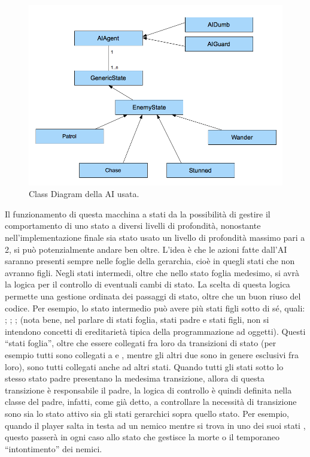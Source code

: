 \begin{figure}[h]
\centerline{\includegraphics[scale=0.45]{images/development/classdiagramAI.png}}
\caption{Class Diagram della AI usata.}
\label{fig:classdiagramAI}
\end{figure}

Il funzionamento di questa macchina a stati da la possibilità di gestire il comportamento di uno stato a diversi livelli di profondità, nonostante nell'implementazione finale sia stato usato un livello di profondità massimo pari a 2, si può potenzialmente andare ben oltre.
L'idea è che le azioni fatte dall'AI saranno presenti sempre nelle foglie della gerarchia, cioè in quegli stati che non avranno figli. Negli stati intermedi, oltre che nello stato foglia medesimo, si avrà la logica per il controllo di eventuali cambi di stato.
La scelta di questa logica permette una gestione ordinata dei passaggi di stato, oltre che un buon riuso del codice. Per esempio, lo stato intermedio  può avere più stati figli sotto di sé, quali: ; ; ;  (nota bene, nel parlare di stati foglia, stati padre e stati figli, non si intendono concetti di ereditarietà tipica della programmazione ad oggetti). Questi ``stati foglia'', oltre che essere collegati fra loro da transizioni di stato (per esempio tutti sono collegati a  e , mentre gli altri due sono in genere esclusivi fra loro), sono tutti collegati anche ad altri stati. Quando tutti gli stati sotto lo stesso stato padre presentano la medesima transizione, allora di questa transizione è responsabile il padre, la logica di controllo è quindi definita nella classe del padre, infatti, come già detto, a controllare la necessità di transizione sono sia lo stato attivo sia gli stati gerarchici sopra quello stato. Per esempio, quando il player salta in testa ad un nemico mentre si trova in uno dei suoi stati , questo passerà in ogni caso allo stato  che gestisce la morte o il temporaneo ``intontimento'' dei nemici.

